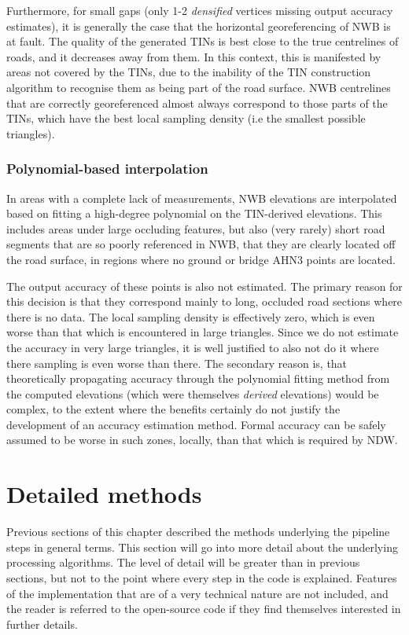 Furthermore, for small gaps (only 1-2 \textit{densified} vertices missing output accuracy estimates), it is generally the case that the horizontal georeferencing of NWB is at fault. The quality of the generated TINs is best close to the true centrelines of roads, and it decreases away from them. In this context, this is manifested by areas not covered by the TINs, due to the inability of the TIN construction algorithm to recognise them as being part of the road surface. NWB centrelines that are correctly georeferenced almost always correspond to those parts of the TINs, which have the best local sampling density (i.e the smallest possible triangles).

\subsubsection{Polynomial-based interpolation}

In areas with a complete lack of measurements, NWB elevations are interpolated based on fitting a high-degree polynomial on the TIN-derived elevations. This includes areas under large occluding features, but also (very rarely) short road segments that are so poorly referenced in NWB, that they are clearly located off the road surface, in regions where no ground or bridge AHN3 points are located.

The output accuracy of these points is also not estimated. The primary reason for this decision is that they correspond mainly to long, occluded road sections where there is no data. The local sampling density is effectively zero, which is even worse than that which is encountered in large triangles. Since we do not estimate the accuracy in very large triangles, it is well justified to also not do it where there sampling is even worse than there. The secondary reason is, that theoretically propagating accuracy through the polynomial fitting method from the computed elevations (which were themselves \textit{derived} elevations) would be complex, to the extent where the benefits certainly do not justify the development of an accuracy estimation method. Formal accuracy can be safely assumed to be worse in such zones, locally, than that which is required by NDW.

\section{Detailed methods}
\label{sec:methods}

Previous sections of this chapter described the methods underlying the pipeline steps in general terms. This section will go into more detail about the underlying processing algorithms. The level of detail will be greater than in previous sections, but not to the point where every step in the code is explained. Features of the implementation that are of a very technical nature are not included, and the reader is referred to the open-source code if they find themselves interested in further details.

